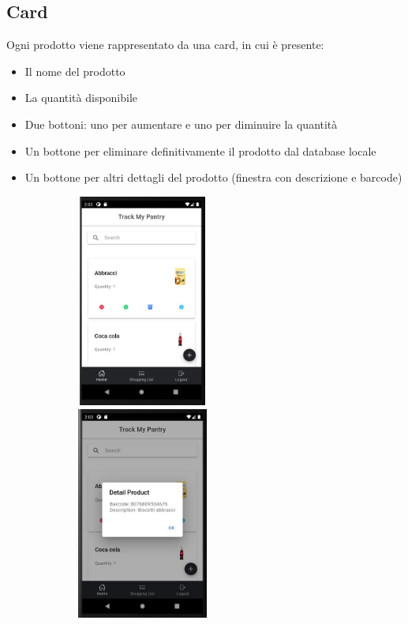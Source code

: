 \documentclass[11pt]{article}
\begin{document}
\subsection{Card}
Ogni prodotto viene rappresentato da una card, in cui è presente:

\begin{multicols}{2}
\begin{itemize}
\item Il nome del prodotto
\item La quantità disponibile
\item Due bottoni: uno per aumentare e uno per diminuire la quantità
\columnbreak
\item Un bottone per eliminare definitivamente il prodotto dal database locale
\item Un bottone per altri dettagli del prodotto (finestra con descrizione e barcode)
\end{itemize}
\end{multicols}

\newpage

\begin{figure}
\centering
\begin{minipage}{.5\textwidth}
  \centering
  \includegraphics[width=7cm,height=7cm,keepaspectratio]{Home}
\end{minipage}%
\begin{minipage}{.5\textwidth}
  \centering
  \includegraphics[width=7cm,height=7cm,keepaspectratio]{Home_detail}
\end{minipage}
\end{figure}
\end{document}
